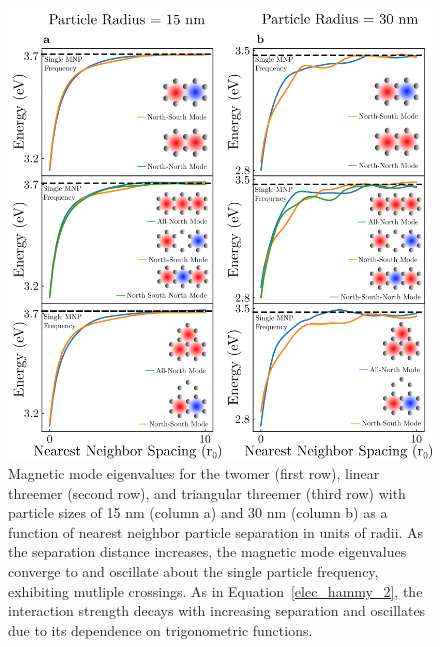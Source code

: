 \documentclass[journal=ancac3,manuscript=article]{achemso}
\begin{document}
\begin{figure}
\centering
\includegraphics[width=.6\paperwidth]{spacing_study.png}
\caption{Magnetic mode eigenvalues for the twomer (first row), linear threemer (second row), and triangular threemer (third row) with particle sizes of 15 nm (column a) and 30 nm (column b) as a function of nearest neighbor particle separation in units of radii. As the separation distance increases, the magnetic mode eigenvalues converge to and oscillate about the single particle frequency, exhibiting mutliple crossings. As in Equation~\ref{elec_hammy_2}, the interaction strength decays with increasing separation and oscillates due to its dependence on trigonometric functions.}
\label{spacing}
\end{figure}
\end{document}
